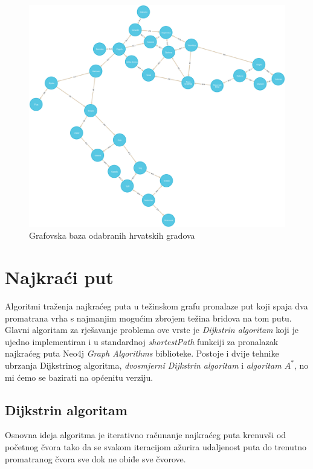 \documentclass[10pt]{scrartcl}
\begin{document}
\begin{figure}[H]
    \centering
    \includegraphics[scale=0.3]{graph}
    \caption{Grafovska baza odabranih hrvatskih gradova}
    \label{fig:baza}
\end{figure}


\pagebreak[2]

\section{Najkraći put}

Algoritmi traženja najkraćeg puta u težinskom grafu
pronalaze put koji spaja dva promatrana vrha s najmanjim
mogućim zbrojem težina bridova na tom putu. Glavni
algoritam za rješavanje problema ove vrste je
\emph{Dijkstrin algoritam} koji je ujedno implementiran
i u standardnoj \emph{shortestPath} funkciji za
pronalazak najkraćeg puta Neo4j \emph{Graph Algorithms}
biblioteke. Postoje i dvije tehnike ubrzanja Dijkstrinog
algoritma, \emph{dvosmjerni Dijkstrin algoritam} i
\emph{algoritam $A^*$}, no mi ćemo se bazirati na
općenitu verziju.

\subsection{Dijkstrin algoritam}

Osnovna ideja algoritma je iterativno računanje najkraćeg puta krenuvši od početnog čvora tako da se svakom iteracijom ažurira udaljenost puta do trenutno promatranog čvora sve dok ne obiđe sve čvorove.
\end{document}
